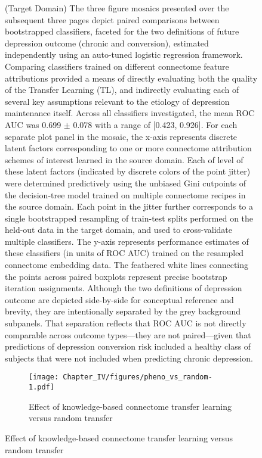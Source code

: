 \documentclass[
  notitlepage]{article}
\begin{document}
\begin{figure}
    \centering
    \caption{(Target Domain) \label{fig:all_comparison_freq}\scriptsize{The three figure mosaics presented over the subsequent three pages depict paired comparisons between bootstrapped classifiers, faceted for the two definitions of future depression outcome (chronic and conversion), estimated independently using an auto-tuned logistic regression framework. Comparing classifiers trained on different connectome feature attributions provided a means of directly evaluating both the quality of the Transfer Learning (TL), and indirectly evaluating each of several key assumptions relevant to the etiology of depression maintenance itself. Across all classifiers investigated, the mean ROC AUC was 0.699 $\pm$ 0.078 with a range of [0.423, 0.926]. For each separate plot panel in the mosaic, the x-axis represents discrete latent factors corresponding to one or more connectome attribution schemes of interest learned in the source domain. Each of level of these latent factors (indicated by discrete colors of the point jitter) were determined predictively using the unbiased Gini cutpoints of the decision-tree model trained on multiple connectome recipes in the source domain. Each point in the jitter further corresponds to a single bootstrapped resampling of train-test splits performed on the held-out data in the target domain, and used to cross-validate multiple classifiers. The y-axis represents performance estimates of these classifiers (in units of ROC AUC) trained on the resampled connectome embedding data. The feathered white lines connecting the points across paired boxplots represent precise bootstrap iteration assignments. Although the two definitions of depression outcome are depicted side-by-side for conceptual reference and brevity, they are intentionally separated by the grey background subpanels. That separation reflects that ROC AUC is not directly comparable across outcome types---they are not paired---given that predictions of depression conversion risk included a healthy class of subjects that were not included when predicting chronic depression.}}
\end{figure}
\begin{figure}
    \ContinuedFloat
    \centering
    \begin{subfigure}{0.7\textwidth}
        \centering
        \caption{\label{fig:pheno_vs_random}\scriptsize{Effect of knowledge-based connectome transfer learning versus random transfer}}
          \texttt{[image: Chapter\_IV/figures/pheno\_vs\_random-1.pdf]}
    \end{subfigure}
\end{figure}
\end{document}
